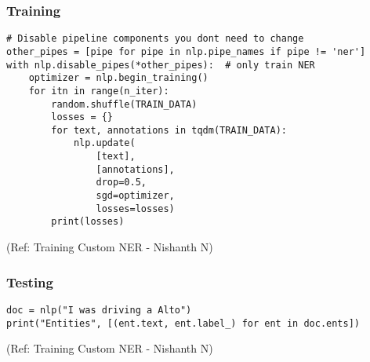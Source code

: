\begin{frame}[fragile]\frametitle{Training}


\begin{lstlisting}
# Disable pipeline components you dont need to change
other_pipes = [pipe for pipe in nlp.pipe_names if pipe != 'ner']
with nlp.disable_pipes(*other_pipes):  # only train NER
    optimizer = nlp.begin_training()
    for itn in range(n_iter):
        random.shuffle(TRAIN_DATA)
        losses = {}
        for text, annotations in tqdm(TRAIN_DATA):
            nlp.update(
                [text],  
                [annotations],  
                drop=0.5,  
                sgd=optimizer,
                losses=losses)
        print(losses)
\end{lstlisting}

{\tiny (Ref: Training Custom NER - Nishanth N)}

\end{frame}

\begin{frame}[fragile]\frametitle{Testing}


\begin{lstlisting}
doc = nlp("I was driving a Alto")
print("Entities", [(ent.text, ent.label_) for ent in doc.ents])
\end{lstlisting}

{\tiny (Ref: Training Custom NER - Nishanth N)}

\end{frame}